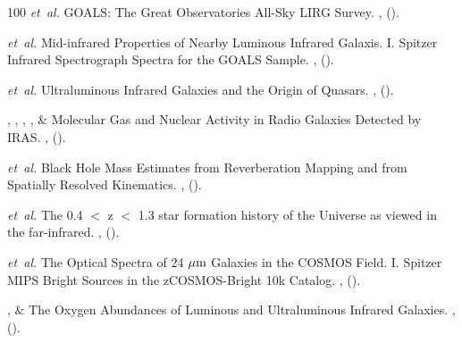 \documentclass{nature2}
\begin{document}
\begin{thebibliography}{100}
\emph{et~al.}
\newblock GOALS: The Great Observatories All-Sky LIRG Survey.
\newblock \emph{} \textbf{},
 ().

\emph{et~al.}
\newblock Mid-infrared Properties of Nearby Luminous Infrared Galaxis. I. Spitzer Infrared Spectrograph Spectra for the GOALS Sample.
\newblock \emph{} \textbf{},
 ().

 \emph{et~al.}
\newblock Ultraluminous Infrared Galaxies and the Origin of Quasars.
\newblock \emph{} \textbf{},
 ().

, , , ,  \& 
\newblock Molecular Gas and Nuclear Activity in Radio Galaxies Detected by IRAS.
\newblock \emph{} \textbf{},
 ().

 \emph{et~al.}
\newblock Black Hole Mass Estimates from Reverberation Mapping and from Spatially Resolved Kinematics.
\newblock \emph{} \textbf{},
 ().

 \emph{et~al.}
\newblock The 0.4 \ensuremath{<} z \ensuremath{<} 1.3 star formation history of the Universe as viewed in the far-infrared.
\newblock \emph{} \textbf{},
 ().

 \emph{et~al.}
\newblock The Optical Spectra of 24 $\rm \mu m$ Galaxies in the COSMOS Field. I. Spitzer MIPS Bright Sources in the zCOSMOS-Bright 10k Catalog.
\newblock \emph{} \textbf{},
 ().

,  \& 
\newblock The Oxygen Abundances of Luminous and Ultraluminous Infrared Galaxies.
\newblock \emph{} \textbf{},
   ().


\end{thebibliography}
\end{document}
